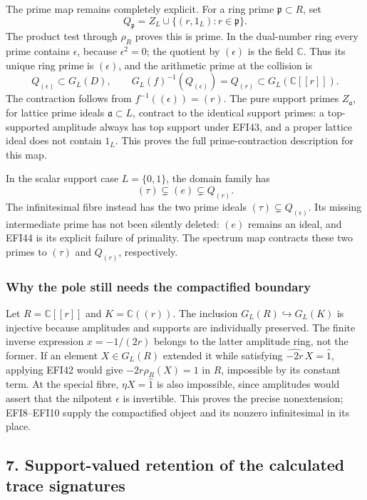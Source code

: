 \documentclass[
  10pt,
  a4paper,
]{article}
\begin{document}
The prime map remains completely explicit. For a ring prime
\(\mathfrak p\subset R\), set \[
Q_{\mathfrak p}=
Z_L\cup\{(r,1_L):r\in\mathfrak p\}.
\tag{EFI45}
\] The product test through \(\rho_R\) proves this is prime. In the
dual-number ring every prime contains \(\epsilon\), because
\(\epsilon^2=0\); the quotient by \((\epsilon)\) is the field
\(\mathbb C\). Thus its unique ring prime is \((\epsilon)\), and the
arithmetic prime at the collision is \[
Q_{(\epsilon)}\subset G_L(D),\qquad
G_L(f)^{-1}(Q_{(\epsilon)})=Q_{(r)}
\subset G_L(\mathbb C[[r]]).
\tag{EFI46}
\] The contraction follows from \(f^{-1}((\epsilon))=(r)\). The pure
support primes \(Z_{\mathfrak a}\), for lattice prime ideals
\(\mathfrak a\subset L\), contract to the identical support primes: a
top-supported amplitude always has top support under EFI43, and a proper
lattice ideal does not contain \(1_L\). This proves the full
prime-contraction description for this map.

In the scalar support case \(L=\{0,1\}\), the domain family has \[
(\tau)\subsetneq(e)\subsetneq Q_{(r)}.
\tag{EFI47}
\] The infinitesimal fibre instead has the two prime ideals
\((\tau)\subsetneq Q_{(\epsilon)}\). Its missing intermediate prime has
not been silently deleted: \((e)\) remains an ideal, and EFI44 is its
explicit failure of primality. The spectrum map contracts these two
primes to \((\tau)\) and \(Q_{(r)}\), respectively.

\subsubsection{Why the pole still needs the compactified
boundary}\label{why-the-pole-still-needs-the-compactified-boundary}

Let \(R=\mathbb C[[r]]\) and \(K=\mathbb C((r))\). The inclusion
\(G_L(R)\hookrightarrow G_L(K)\) is injective because amplitudes and
supports are individually preserved. The finite inverse expression
\(x=-1/(2r)\) belongs to the latter amplitude ring, not the former. If
an element \(X\in G_L(R)\) extended it while satisfying
\(\widehat{-2r}\,X=\widehat1\), applying EFI42 would give
\(-2r\rho_R(X)=1\) in \(R\), impossible by its constant term. At the
special fibre, \(\eta X=\widehat1\) is also impossible, since amplitudes
would assert that the nilpotent \(\epsilon\) is invertible. This proves
the precise nonextension; EFI8--EFI10 supply the compactified object and
its nonzero infinitesimal in its place.

\subsection{7. Support-valued retention of the calculated trace
signatures}\label{support-valued-retention-of-the-calculated-trace-signatures}
\end{document}
